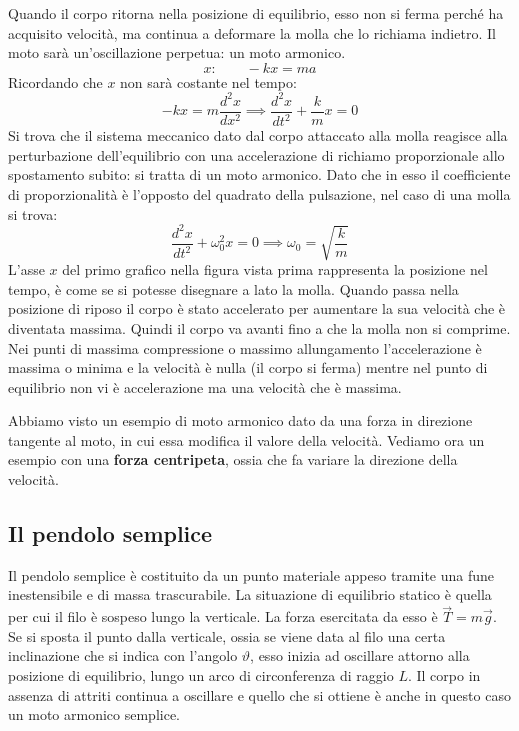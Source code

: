 \documentclass[10pt,a4paper]{book}
\begin{document}
Quando il corpo ritorna nella posizione di equilibrio, esso non si ferma perché ha acquisito velocità, ma continua a deformare la molla che lo richiama indietro. Il moto sarà un'oscillazione perpetua: un moto armonico.
\[
	x: \qquad -kx=ma
\]
Ricordando che $x$ non sarà costante nel tempo:
\[
	-kx=m\frac{d^2x}{dx^2} \implies \frac{d^2x}{dt^2}+\frac{k}{m}x=0
\]
Si trova che il sistema meccanico dato dal corpo attaccato alla molla reagisce alla perturbazione dell'equilibrio con una accelerazione di richiamo proporzionale allo spostamento subito: si tratta di un moto armonico. Dato che in esso il coefficiente di proporzionalità è l'opposto del quadrato della pulsazione, nel caso di una molla si trova:
\[
	\frac{d^2x}{dt^2}+\omega^2_0 x=0 \implies \omega_0=\sqrt{\frac{k}{m}}
\]
L'asse $x$ del primo grafico nella figura vista prima rappresenta la posizione nel tempo, è come se si potesse disegnare a lato la molla. Quando passa nella posizione di riposo il corpo è stato accelerato per aumentare la sua velocità che è diventata massima. Quindi il corpo va avanti fino a che la molla non si comprime.  Nei punti di massima compressione o massimo allungamento l'accelerazione è massima o minima e la velocità è nulla (il corpo si ferma) mentre nel punto di equilibrio non vi è accelerazione ma una velocità che è massima.

Abbiamo visto un esempio di moto armonico dato da una forza in direzione tangente al moto, in cui essa modifica il valore della velocità. Vediamo ora un esempio con una \textbf{forza centripeta}, ossia che fa variare la direzione della velocità.

\subsection{Il pendolo semplice}

Il pendolo semplice è costituito da un punto materiale appeso tramite una fune inestensibile e di massa trascurabile. La situazione di equilibrio statico è quella per cui il filo è sospeso lungo la verticale. La forza esercitata da esso è $\vec{T}=m\vec{g}$. Se si sposta il punto dalla verticale, ossia se viene data al filo una certa inclinazione che si indica con l'angolo $\vartheta$, esso inizia ad oscillare attorno alla posizione di equilibrio, lungo un arco di circonferenza di raggio $L$. Il corpo in assenza di attriti continua a oscillare e quello che si ottiene è anche in questo caso un moto armonico semplice.
\end{document}
